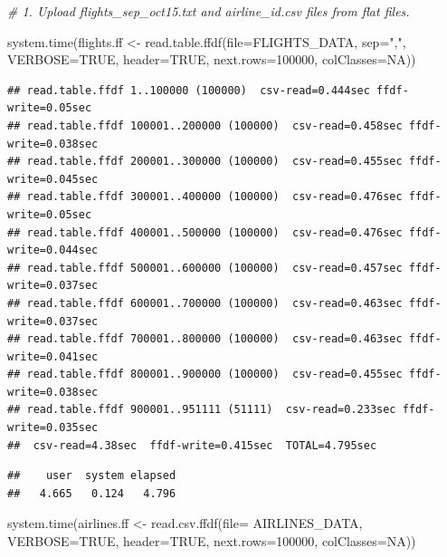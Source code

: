 \documentclass[
  12pt,
]{style/krantz}
\newenvironment{Shaded}{\begin{snugshade}}{\end{snugshade}}
\newcommand{\AttributeTok}[1]{\textcolor[rgb]{0.77,0.63,0.00}{#1}}
\newcommand{\CommentTok}[1]{\textcolor[rgb]{0.56,0.35,0.01}{\textit{#1}}}
\newcommand{\ConstantTok}[1]{\textcolor[rgb]{0.00,0.00,0.00}{#1}}
\newcommand{\DecValTok}[1]{\textcolor[rgb]{0.00,0.00,0.81}{#1}}
\newcommand{\FunctionTok}[1]{\textcolor[rgb]{0.00,0.00,0.00}{#1}}
\newcommand{\NormalTok}[1]{#1}
\newcommand{\OtherTok}[1]{\textcolor[rgb]{0.56,0.35,0.01}{#1}}
\newcommand{\StringTok}[1]{\textcolor[rgb]{0.31,0.60,0.02}{#1}}
\begin{document}
\begin{Shaded}
\begin{Highlighting}[]
\CommentTok{\# 1. Upload flights\_sep\_oct15.txt and airline\_id.csv files from flat files. }

\FunctionTok{system.time}\NormalTok{(flights.ff }\OtherTok{\textless{}{-}} \FunctionTok{read.table.ffdf}\NormalTok{(}\AttributeTok{file=}\NormalTok{FLIGHTS\_DATA,}
                                          \AttributeTok{sep=}\StringTok{","}\NormalTok{,}
                                          \AttributeTok{VERBOSE=}\ConstantTok{TRUE}\NormalTok{,}
                                          \AttributeTok{header=}\ConstantTok{TRUE}\NormalTok{,}
                                          \AttributeTok{next.rows=}\DecValTok{100000}\NormalTok{,}
                                          \AttributeTok{colClasses=}\ConstantTok{NA}\NormalTok{))}
\end{Highlighting}
\end{Shaded}

\begin{verbatim}
## read.table.ffdf 1..100000 (100000)  csv-read=0.444sec ffdf-write=0.05sec
## read.table.ffdf 100001..200000 (100000)  csv-read=0.458sec ffdf-write=0.038sec
## read.table.ffdf 200001..300000 (100000)  csv-read=0.455sec ffdf-write=0.045sec
## read.table.ffdf 300001..400000 (100000)  csv-read=0.476sec ffdf-write=0.05sec
## read.table.ffdf 400001..500000 (100000)  csv-read=0.476sec ffdf-write=0.044sec
## read.table.ffdf 500001..600000 (100000)  csv-read=0.457sec ffdf-write=0.037sec
## read.table.ffdf 600001..700000 (100000)  csv-read=0.463sec ffdf-write=0.037sec
## read.table.ffdf 700001..800000 (100000)  csv-read=0.463sec ffdf-write=0.041sec
## read.table.ffdf 800001..900000 (100000)  csv-read=0.455sec ffdf-write=0.038sec
## read.table.ffdf 900001..951111 (51111)  csv-read=0.233sec ffdf-write=0.035sec
##  csv-read=4.38sec  ffdf-write=0.415sec  TOTAL=4.795sec
\end{verbatim}

\begin{verbatim}
##    user  system elapsed 
##   4.665   0.124   4.796
\end{verbatim}

\begin{Shaded}
\begin{Highlighting}[]
\FunctionTok{system.time}\NormalTok{(airlines.ff }\OtherTok{\textless{}{-}} \FunctionTok{read.csv.ffdf}\NormalTok{(}\AttributeTok{file=}\NormalTok{ AIRLINES\_DATA,}
                             \AttributeTok{VERBOSE=}\ConstantTok{TRUE}\NormalTok{,}
                             \AttributeTok{header=}\ConstantTok{TRUE}\NormalTok{,}
                             \AttributeTok{next.rows=}\DecValTok{100000}\NormalTok{,}
                             \AttributeTok{colClasses=}\ConstantTok{NA}\NormalTok{))}
\end{Highlighting}
\end{Shaded}
\end{document}
